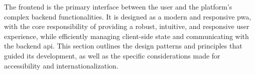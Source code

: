 The frontend is the primary interface between the user and the platform's complex backend functionalities. It is designed as a modern and responsive \acl{pwa}, with the core responsibility of providing a robust, intuitive, and responsive user experience, while efficiently managing client-side state and communicating with the backend \acs{api}. This section outlines the design patterns and principles that guided its development, as well as the specific considerations made for accessibility and internationalization.